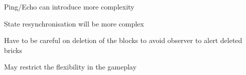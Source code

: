 
\begin{description}[style=nextline]
  \item[R1\label{r1}] Ping/Echo can introduce more complexity
  \item[R2\label{r2}] State resynchronisation will be more complex
  \item[R3\label{r3}] Have to be careful on deletion of the blocks to avoid observer to alert deleted bricks
  \item[R4\label{r4}] May restrict the flexibility in the gameplay
\end{description}
